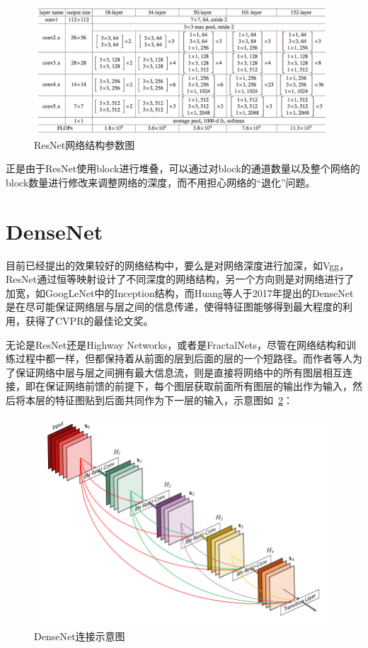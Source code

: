 \begin{figure}[htbp]
	\centering
	\includegraphics[width=\linewidth]{readings_figures/ResNet_params.jpeg}
	\caption{ResNet网络结构参数图}
	\label{fig:ResNet_params}
\end{figure}

正是由于ResNet使用block进行堆叠，可以通过对block的通道数量以及整个网络的block数量进行修改来调整网络的深度，而不用担心网络的“退化”问题。

\section{DenseNet}

目前已经提出的效果较好的网络结构中，要么是对网络深度进行加深，如Vgg，ResNet通过恒等映射设计了不同深度的网络结构，另一个方向则是对网络进行了加宽，如GoogLeNet中的Inception结构，而Huang等人于2017年提出的DenseNet\cite{huang2017densely}是在尽可能保证网络层与层之间的信息传递，使得特征图能够得到最大程度的利用，获得了CVPR的最佳论文奖。

无论是ResNet还是Highway Networks，或者是FractalNets，尽管在网络结构和训练过程中都一样，但都保持着从前面的层到后面的层的一个短路径。而作者等人为了保证网络中层与层之间拥有最大信息流，则是直接将网络中的所有图层相互连接，即在保证网络前馈的前提下，每个图层获取前面所有图层的输出作为输入，然后将本层的特征图贴到后面共同作为下一层的输入，示意图如~\ref{fig:DenseNet_block}：

\begin{figure}[htbp]
	\centering
	\includegraphics[width=\linewidth]{readings_figures/DenseNet_block.png}
	\caption{DenseNet连接示意图}
	\label{fig:DenseNet_block}
\end{figure}

